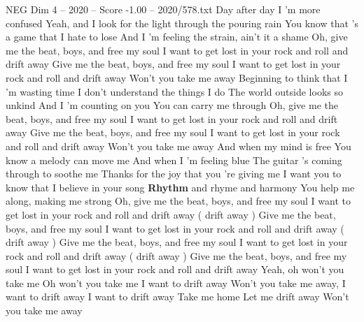 \begin{textsample}{NEG Dim 4 – 2020 – Score -1.00 – 2020/578.txt}  \label{ex:f4_neg_023}
Day after day I 'm more confused Yeah, and I look for the light through the pouring rain You know that 's a game that I hate to lose And I 'm feeling the strain, ain't it a shame Oh, give me the beat, boys, and free my soul I want to get lost in your rock and roll and drift away Give me the beat, boys, and free my soul I want to get lost in your rock and roll and drift away Won't you take me away Beginning to think that I 'm wasting time I don't understand the things I do The world outside looks so unkind And I 'm counting on you You can carry me through Oh, give me the beat, boys, and free my soul I want to get lost in your rock and roll and drift away Give me the beat, boys, and free my soul I want to get lost in your rock and roll and drift away Won't you take me away And when my mind is free You know a melody can move me And when I 'm feeling blue The guitar 's coming through to soothe me Thanks for the joy that you 're giving me I want you to know that I believe in your song \textbf{Rhythm} and rhyme and harmony You help me along, making me strong Oh, give me the beat, boys, and free my soul I want to get lost in your rock and roll and drift away ( drift away ) Give me the beat, boys, and free my soul I want to get lost in your rock and roll and drift away ( drift away ) Give me the beat, boys, and free my soul I want to get lost in your rock and roll and drift away ( drift away ) Give me the beat, boys, and free my soul I want to get lost in your rock and roll and drift away Yeah, oh won't you take me Oh won't you take me I want to drift away Won't you take me away, I want to drift away I want to drift away Take me home Let me drift away Won't you take me away

\end{textsample}
